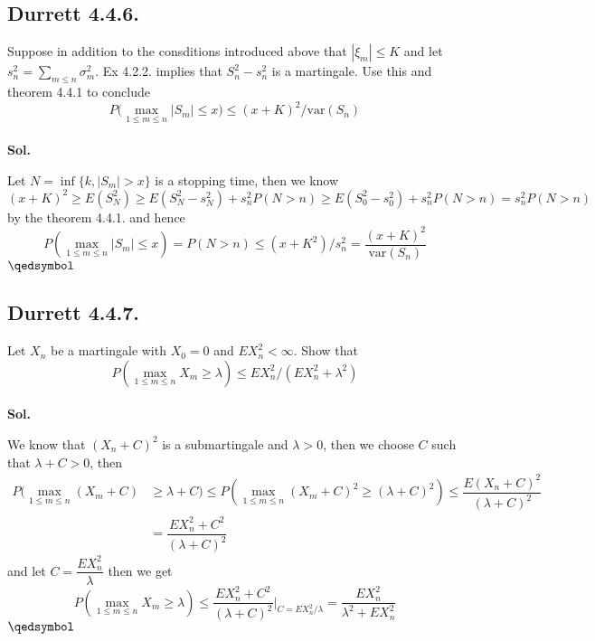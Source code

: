 \documentclass[lang=en,11pt,a4paper,citestyle =authoryear]{elegantpaper}
\newcommand{\prvd}{$\hfill \qedsymbol$}
\begin{document}
\subsection*{Durrett 4.4.6.} 
Suppose in addition to the consditions introduced above that $|\xi_m|\leq K$ and let $s_n^2 = \sum_{m\leq n}\sigma^2_m$. Ex 4.2.2. implies that $S_n^2 - s_n^2$ is a martingale. Use this and theorem 4.4.1 to conclude
\[
P\Big(\max_{1\leq m\leq n} |S_m| \leq x\Big) \leq (x+K)^2/\text{var}(S_n)
\] 
\vspace{0.5em}\\
\textbf{Sol.} \par
Let $N = \inf\{k, |S_m| > x\}$ is a stopping time, then we know
\[
(x+K)^2 \geq E(S_N^2) \geq E(S_N^2 - s_N^2) + s_n^2P(N>n) \geq E(S_0^2-s_0^2) + s_n^2P(N>n) = s_n^2P(N>n)
\]
by the theorem 4.4.1. and hence
\[
P(\max_{1\leq m \leq n}|S_m|\leq x) = P(N>n) \leq (x+K^2)/s_n^2 = \dfrac{(x+K)^2}{\text{var}(S_n)}
\]
\prvd
\vspace{0.5em}

\subsection*{Durrett 4.4.7.} 
Let $X_n$ be a martingale with $X_0 = 0$ and $EX_n^2 < \infty$. Show that
\[P(\max_{1\leq m \leq n}X_m \geq \lambda) \leq EX_n^2/(EX_n^2 + \lambda ^2)\] 
\vspace{0.5em}\\
\textbf{Sol.} \par
We know that $(X_n+C)^2$ is a submartingale and $\lambda > 0$, then we choose $C$ such that $\lambda +C >0$, then
\[
\begin{aligned}
P(\max_{1\leq m\leq n}(X_m+C) &\geq \lambda +C) \leq P(\max_{1\leq m \leq n}(X_m+C)^2 \geq (\lambda+C)^2) \leq \dfrac{E(X_n+C)^2}{(\lambda+C)^2} \\ &= \dfrac{EX_n^2 + C^2}{(\lambda+C)^2}
\end{aligned}
\]
and let $C = \dfrac{EX_n^2}{\lambda}$ then we get
\[
P(\max_{1\leq m \leq n}X_m \geq \lambda) \leq \dfrac{EX_n^2 + C^2}{(\lambda+C)^2}|_{C = EX_n^2/\lambda} = \dfrac{EX_n^2}{\lambda^2+EX_n^2}
\]
\prvd
\vspace{0.5em}

\addappheadtotoc
\end{document}
